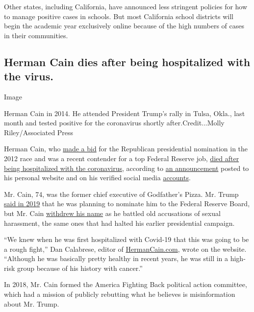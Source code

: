 Other states, including California, have announced less stringent
policies for how to manage positive cases in schools. But most
California school districts will begin the academic year exclusively
online because of the high numbers of cases in their communities.

\hypertarget{herman-cain-dies-after-being-hospitalized-with-the-virus}{%
\subsection{Herman Cain dies after being hospitalized with the
virus.}\label{herman-cain-dies-after-being-hospitalized-with-the-virus}}

Image

Herman Cain in 2014. He attended President Trump's rally in Tulsa,
Okla., last month and tested positive for the coronavirus shortly
after.Credit...Molly Riley/Associated Press

Herman Cain, who
\href{https://www.nytimes.com/2011/12/04/us/politics/herman-cain-suspends-his-presidential-campaign.html}{made
a bid} for the Republican presidential nomination in the 2012 race and
was a recent contender for a top Federal Reserve job,
\href{https://www.nytimes.com/2020/07/30/us/politics/herman-cain-dead.html}{died
after being hospitalized with the coronavirus}, according to
\href{https://hermancain.com/heartbroken-world-poorer-herman-cain-gone-lord/?ff_source=twitter\&ff_medium=thenewvoice\&ff_content=2020-07-30}{an
announcement} posted to his personal website and on his verified social
media \href{https://twitter.com/THEHermanCain}{accounts}.

Mr. Cain, 74, was the former chief executive of Godfather's Pizza. Mr.
Trump
\href{https://www.nytimes.com/2019/04/04/business/herman-cain-federal-reserve.html}{said
in 2019} that he was planning to nominate him to the Federal Reserve
Board, but Mr. Cain
\href{https://www.nytimes.com/2019/04/22/us/politics/trump-herman-cain-federal-reserve.html}{withdrew
his name} as he battled old accusations of sexual harassment, the same
ones that had halted his earlier presidential campaign.

``We knew when he was first hospitalized with Covid-19 that this was
going to be a rough fight,'' Dan Calabrese, editor of
\href{http://hermancain.com/}{HermanCain.com}, wrote on the website.
``Although he was basically pretty healthy in recent years, he was still
in a high-risk group because of his history with cancer.''

In 2018, Mr. Cain formed the America Fighting Back political action
committee, which had a mission of publicly rebutting what he believes is
misinformation about Mr. Trump.

